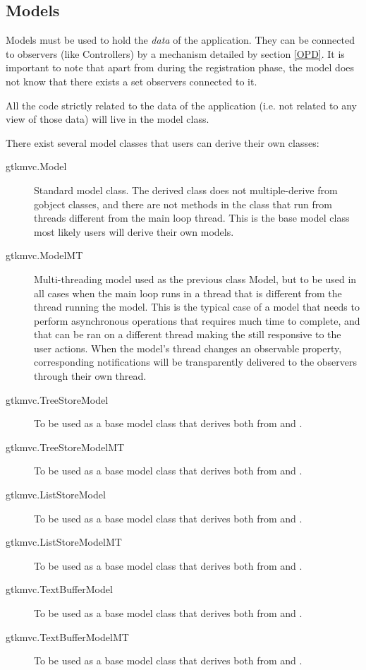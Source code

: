 \subsection{\label{MODELS} Models}
Models must be used to hold the \emph{data} of the application. They
can be connected to observers (like Controllers) by a mechanism
detailed by section \ref{OPD}.  It is important to note that apart
from during the registration phase, the model does not know that
there exists a set observers connected to it.

All the code strictly related to the data of the application (i.e. not
related to any view of those data) will live in the model class. 

There exist several model classes that users can derive their own
classes:

\begin {description}
\item [gtkmvc.Model] Standard model class. The derived class does not
  multiple-derive from gobject classes, and there are not methods in
  the class that run from threads different from the \pygtk main loop
  thread. This is the base model class most likely users will derive
  their own models.

\item [gtkmvc.ModelMT] Multi-threading model used as the previous
  class Model, but to be used in all cases when the \pygtk main loop
  runs in a thread that is different from the thread running the
  model. This is the typical case of a model that needs to perform
  asynchronous operations that requires much time to complete, and
  that can be ran on a different thread making the \gui still
  responsive to the user actions. When the model's thread changes an
  observable property, corresponding notifications will be
  transparently delivered to the observers through their own thread.

\item [gtkmvc.TreeStoreModel] To be used as a base model class that
  derives both from  and .

\item [gtkmvc.TreeStoreModelMT] To be used as a base model class that
  derives both from  and .

\item [gtkmvc.ListStoreModel] To be used as a base model class that
  derives both from  and .

\item [gtkmvc.ListStoreModelMT] To be used as a base model class that
  derives both from  and . 

\item [gtkmvc.TextBufferModel] To be used as a base model class that
  derives both from  and .

\item [gtkmvc.TextBufferModelMT] To be used as a base model class that
  derives both from  and .

\end{description}



